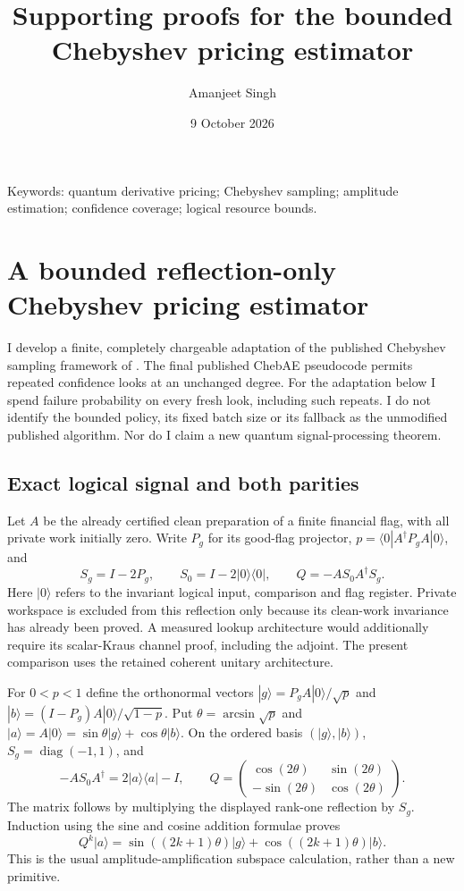 \documentclass[11pt]{article}
\title{Supporting proofs for the bounded Chebyshev pricing estimator}
\author{Amanjeet Singh}
\date{9 October 2026}
\begin{document}
\maketitle
\noindent Keywords: quantum derivative pricing; Chebyshev sampling;
amplitude estimation; confidence coverage; logical resource bounds.

\section{A bounded reflection-only Chebyshev pricing estimator}
\label{supp:bounded-chebyshev-estimator}

I develop a finite, completely chargeable adaptation of the published
Chebyshev sampling framework of \citet{rallfuller2023}. The final published
ChebAE pseudocode permits repeated confidence looks at an unchanged degree.
For the adaptation below I spend failure probability on every fresh look,
including such repeats. I do not identify the bounded policy, its fixed
batch size or its fallback as the unmodified published algorithm. Nor do I
claim a new quantum signal-processing theorem.

\subsection{Exact logical signal and both parities}

Let $A$ be the already certified clean preparation of a finite financial
flag, with all private work initially zero. Write $P_g$ for its good-flag
projector, $p=\langle0|A^\dagger P_gA|0\rangle$, and
\[
 S_g=I-2P_g,\qquad S_0=I-2|0\rangle\langle0|,
 \qquad Q=-AS_0A^\dagger S_g.
\]
Here $|0\rangle$ refers to the invariant logical input, comparison and
flag register. Private workspace is excluded from this reflection only
because its clean-work invariance has already been proved. A measured
lookup architecture would additionally require its scalar-Kraus channel
proof, including the adjoint. The present comparison uses the retained
coherent unitary architecture.

For $0<p<1$ define the orthonormal vectors
$|g\rangle=P_gA|0\rangle/\sqrt p$ and
$|b\rangle=(I-P_g)A|0\rangle/\sqrt{1-p}$. Put
$\theta=\arcsin\sqrt p$ and
$|a\rangle=A|0\rangle=\sin\theta|g\rangle+
\cos\theta|b\rangle$. On the ordered basis $(|g\rangle,|b\rangle)$,
$S_g=\operatorname{diag}(-1,1)$, and
\[
 -AS_0A^\dagger=2|a\rangle\langle a|-I,
 \qquad
 Q=\begin{pmatrix}
 \cos(2\theta)&\sin(2\theta)\\
 -\sin(2\theta)&\cos(2\theta)
 \end{pmatrix}.
\]
The matrix follows by multiplying the displayed rank-one reflection by
$S_g$. Induction using the sine and cosine addition formulae proves
\[
 Q^k|a\rangle
 =\sin((2k+1)\theta)|g\rangle+
  \cos((2k+1)\theta)|b\rangle.
\]
This is the usual amplitude-amplification subspace calculation, rather
than a new primitive.
\end{document}
